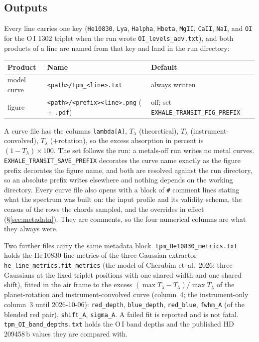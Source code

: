 \documentclass[english,a4paper]{my_memo}
\begin{document}
\subsection{Outputs}\label{sec:outputs}

Every line carries one key (\texttt{He10830}, \texttt{Lya},
\texttt{Halpha}, \texttt{Hbeta}, \texttt{MgII}, \texttt{CaII},
\texttt{NaI}, and \texttt{OI} for the O\,I 1302 triplet when the run wrote
\texttt{OI\_levels\_adv.txt}), and both products of a line are named from that key and
land in the run directory:

\begin{center}
\begin{tabular}{@{}lll@{}}
\hline
Product & Name & Default \\
\hline
model curve & \texttt{<path>/tpm\_<line>.txt} & always written \\
figure & \texttt{<path>/<prefix><line>.png} ($+$ \texttt{.pdf})
        & off; set \texttt{EXHALE\_TRANSIT\_FIG\_PREFIX} \\
\hline
\end{tabular}
\end{center}

\noindent A curve file has the columns \texttt{lambda[A]}, $T_\lambda$
(theoretical), $T_\lambda$ (instrument-convolved), $T_\lambda$
($+$rotation), so the excess absorption in percent is
$(1-T_\lambda)\times100$. The set follows the run: a metals-off run
writes no metal curves. \texttt{EXHALE\_TRANSIT\_SAVE\_PREFIX} decorates
the curve name exactly as the figure prefix decorates the figure name,
and both are resolved against the run directory, so an absolute prefix
writes elsewhere and nothing depends on the working directory. Every curve
file also opens with a block of \texttt{\#} comment lines stating what the
spectrum was built on: the input profile and its validity schema, the census
of the rows the chords sampled, and the overrides in effect
(\S\ref{sec:metadata}). They are comments, so the four numerical columns
are what they always were.

Two further files carry the same metadata block.
\texttt{tpm\_He10830\_metrics.txt} holds the He\,10830 line metrics of the
three-Gaussian extractor \texttt{he\_line\_metrics.fit\_metrics} (the
model of Cherubim et~al.\ 2026: three Gaussians at the fixed triplet
positions with one shared width and one shared shift), fitted in the air
frame to the excess $(\max T_\lambda - T_\lambda)/\max T_\lambda$ of the
planet-rotation and instrument-convolved curve (column~4; the instrument-only
column~3 until 2026-10-06): \texttt{red\_depth},
\texttt{blue\_depth}, \texttt{red\_blue}, \texttt{fwhm\_A} (of the blended
red pair), \texttt{shift\_A}, \texttt{sigma\_A}. A failed fit is reported
and is not fatal. \texttt{tpm\_OI\_band\_depths.txt} holds the O\,I band
depths and the published HD\,209458\,b values they are compared with.
\end{document}
